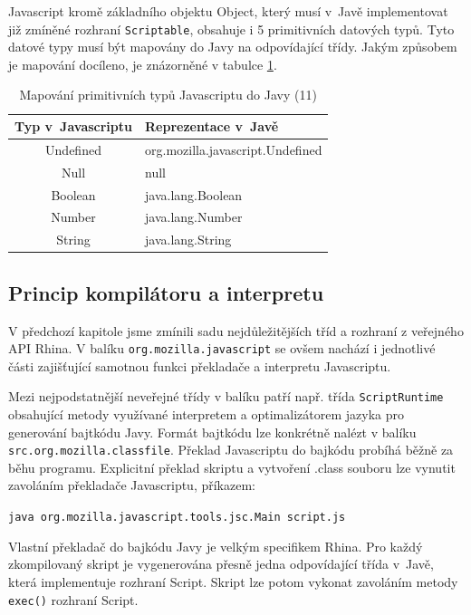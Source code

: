 Javascript kromě základního objektu Object, který musí v~Javě implementovat již zmíněné rozhraní \texttt{Scriptable}, obsahuje i 5 primitivních datových typů. Tyto datové typy musí být mapovány do Javy na odpovídající třídy. Jakým způsobem je mapování docíleno, je znázorněné v tabulce \ref{Table.JavaScriptToJavaMapping}. 

\begin{table}[H]
  \begin{center} 
    \begin{tabular}{| c | l |} \hline
    \textbf{Typ v~Javascriptu} & \textbf{Reprezentace v~Javě} \\ \hline
    Undefined & org.mozilla.javascript.Undefined \\ \hline
    Null & null \\ \hline
    Boolean & java.lang.Boolean  \\ \hline
    Number & java.lang.Number \\ \hline
    String & java.lang.String \\ \hline
    \end{tabular}
    \caption{Mapování primitivních typů Javascriptu do Javy (11)}
    \label{Table.JavaScriptToJavaMapping}
  \end{center}
\end{table}

\subsection{Princip kompilátoru a interpretu}
\label{Chapter.JavaScriptInJavaAnalysis.Rhino.CompilerTechniques}

V předchozí kapitole jsme zmínili sadu nejdůležitějších tříd a rozhraní z veřejného API Rhina. V balíku \texttt{org.mozilla.javascript} se ovšem nachází i jednotlivé části zajišťující samotnou funkci překladače a interpretu Javascriptu.

Mezi nejpodstatnější neveřejné třídy v balíku patří např. třída \texttt{ScriptRuntime} obsahující metody využívané interpretem a optimalizátorem jazyka pro generování bajtkódu Javy. Formát bajtkódu lze konkrétně nalézt v balíku \texttt{src.org.mozilla.classfile}. Překlad Javascriptu do bajkódu probíhá běžně za běhu programu. Explicitní překlad skriptu a vytvoření .class souboru lze vynutit zavoláním překladače Javascriptu, příkazem:

\medskip
\centerline{\texttt{java org.mozilla.javascript.tools.jsc.Main script.js}}
\medskip

Vlastní překladač do bajkódu Javy je velkým specifikem Rhina. Pro každý zkompilovaný skript je vygenerována přesně jedna odpovídající třída v~Javě, která implementuje rozhraní Script. Skript lze potom vykonat zavoláním metody \texttt{exec()} rozhraní Script.

